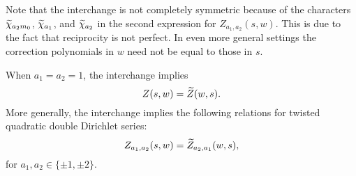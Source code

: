 \documentclass[12pt,reqno,oneside]{amsart}
\begin{document}
    Note that the interchange is not completely symmetric because of the characters $\widetilde{\chi}_{a_{2}m_{0}}$, $\widetilde{\chi}_{a_{1}}$, and $\widetilde{\chi}_{a_{2}}$ in the second expression for $Z_{a_{1},a_{2}}(s,w)$. This is due to the fact that reciprocity is not perfect. In even more general settings the correction polynomials in $w$ need not be equal to those in $s$.

    \begin{remark}\label{rem:symmetry_of_Double_Dirichlet_series}
        When $a_{1} = a_{2} = 1$, the interchange implies
        \[
            Z(s,w) = \widetilde{Z}(w,s).
        \]
        More generally, the interchange implies the following relations for twisted quadratic double Dirichlet series:
        \[
            Z_{a_{1},a_{2}}(s,w) = \widetilde{Z}_{a_{2},a_{1}}(w,s),
        \]
        for $a_{1},a_{2} \in \{\pm1,\pm2\}$.
    \end{remark}
\end{document}
